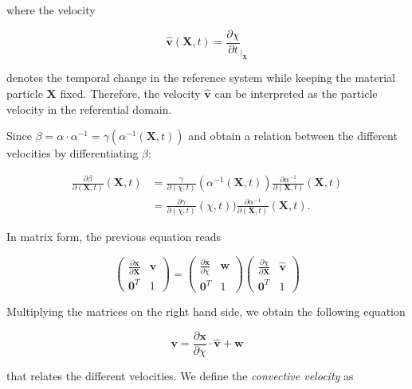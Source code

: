 \documentclass[a4paper,11pt,openright,twoside]{book}
\begin{document}
where the velocity

\begin{equation}
\label{eq:ale:4}
\hat{\mathbf{v}} (\mathbf{X},t) = \frac{\partial \chi}{\partial t}_{|_{\mathbf{X}}}
\end{equation}

denotes the temporal change in the reference system while keeping the material particle $\mathbf{X}$ fixed. Therefore, the velocity $\mathbf{\hat{v}}$ can be interpreted as the particle velocity in the referential domain.

Since $\beta = \alpha \cdot \alpha^{-1} = \gamma(\alpha^{-1}(\mathbf{X},t))$ and obtain a relation between the different velocities by differentiating $\beta$:

\begin{align*}
\frac{\partial \beta}{\partial (\mathbf{X},t)} (\mathbf{X},t)
& = \frac{\gamma}{\partial (\chi, t)}(\alpha^{-1}(\mathbf{X},t)) \frac{\partial \alpha^{-1}}{\partial(\mathbf{X},t)}(\mathbf{X},t) \\
& = \frac{\partial \gamma}{\partial (\chi, t)}(\chi,t)) \frac{\partial \alpha^{-1}}{\partial(\mathbf{X},t)}(\mathbf{X},t).
\end{align*}

In matrix form, the previous equation reads

\begin{equation}
\begin{pmatrix}
\frac{\partial \mathbf{x}}{\partial \mathbf{X}} & \mathbf{v}\\
\mathbf{0}^T & 1
\end{pmatrix} = 
\begin{pmatrix}
\frac{\partial \mathbf{x}}{\partial \chi} & \mathbf{w}\\
\mathbf{0}^T & 1
\end{pmatrix}
\begin{pmatrix}
\frac{\partial \chi}{\partial \mathbf{X}} & \hat{\mathbf{v}}\\
\mathbf{0}^T & 1
\end{pmatrix}
\end{equation}

Multiplying the matrices on the right hand side, we obtain the following equation

\begin{equation}
\mathbf{v} = \frac{\partial \mathbf{x}}{\partial \chi} \cdot \hat{\mathbf{v}} + \mathbf{w}
\end{equation}

that relates the different velocities. We define the \emph{convective velocity} as
\end{document}
